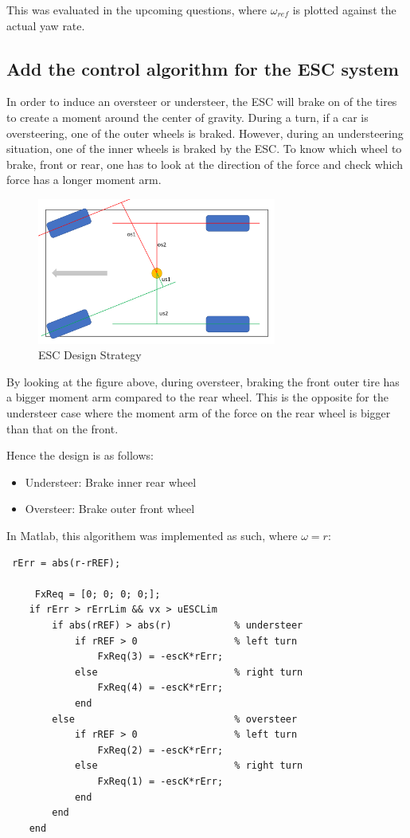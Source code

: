 This was evaluated in the upcoming questions, where $\omega_{ref}$ is plotted against the actual yaw rate. 

\subsection{Add the control algorithm for the ESC system}
In order to induce an oversteer or understeer, the ESC will brake on of the tires to create a moment around the center of gravity.
During a turn, if a car is oversteering, one of the outer wheels is braked. However, during an understeering situation, one of the inner wheels is braked by the ESC. To know which wheel to brake, front or rear, one has to look at the direction of the force and check which force has a longer moment arm.

\begin{figure}[H]
    \centering
    \includegraphics[width=0.7\textwidth]{Figures/underover.PNG}
    \caption{ESC Design Strategy}
\end{figure}

By looking at the figure above, during oversteer, braking the front outer tire has a bigger moment arm compared to the rear wheel. This is the opposite for the understeer case where the moment arm of the force on the rear wheel is bigger than that on the front.

Hence the design is as follows:
\begin{itemize}
    \item Understeer: Brake inner rear wheel
    \item Oversteer: Brake outer front wheel
\end{itemize}

In Matlab, this algorithem was implemented as such, where $\omega =r$:

\begin{lstlisting}
 rErr = abs(r-rREF);

     FxReq = [0; 0; 0; 0;];
    if rErr > rErrLim && vx > uESCLim
        if abs(rREF) > abs(r)           % understeer
            if rREF > 0                 % left turn
                FxReq(3) = -escK*rErr;
            else                        % right turn
                FxReq(4) = -escK*rErr;
            end
        else                            % oversteer
            if rREF > 0                 % left turn
                FxReq(2) = -escK*rErr;
            else                        % right turn
                FxReq(1) = -escK*rErr;
            end
        end
    end
\end{lstlisting}

